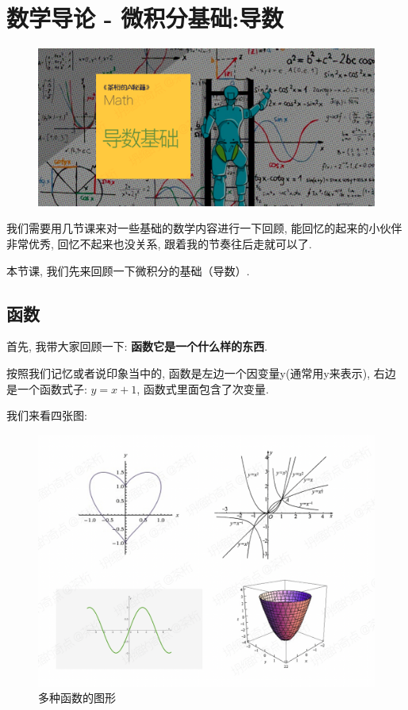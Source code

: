\chapter{数学导论 - 微积分基础:导数}

\begin{figure}[ht]
  \centering\includegraphics[width=1\textwidth]{asset/茶桁的AI秘籍_Math_2.png}
\end{figure}

\newpage

我们需要用几节课来对一些基础的数学内容进行一下回顾, 能回忆的起来的小伙伴非常优秀, 回忆不起来也没关系, 跟着我的节奏往后走就可以了. 

本节课, 我们先来回顾一下微积分的基础（导数）. 

\section{函数}

首先, 我带大家回顾一下: \textbf{函数它是一个什么样的东西}. 

按照我们记忆或者说印象当中的, 函数是左边一个因变量y(通常用y来表示), 右边是一个函数式子: $y=x+1$, 函数式里面包含了次变量. 

我们来看四张图:

\begin{figure}[ht]
  \centering
  \includegraphics[width=1\textwidth]{asset/fa27e701-ba74-4406-bcb2-7956f4188918.png}
  \caption{多种函数的图形}
  \label{fig:img3_1}
\end{figure}

